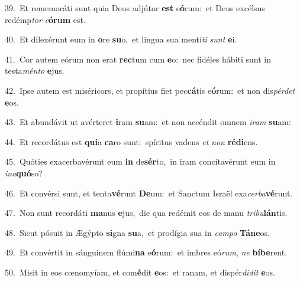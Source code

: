 {\numbfont\textcolor{\numbcolor}{39.}}~Et rememoráti sunt quia Deus adjútor \textbf{est} e\-\textbf{ó}\-rum:~\star et Deus excélsus redémp\textit{tor} \textit{e}\-\textbf{ó}\textbf{rum} est.\par
{\numbfont\textcolor{\numbcolor}{40.}}~Et dilexérunt eum in \textbf{o}\-re \textbf{su}\-o,~\star et lingua sua mentí\textit{ti} \textit{sunt} \textbf{e}\-i.\par
{\numbfont\textcolor{\numbcolor}{41.}}~Cor autem eórum non erat \textbf{rec}\-tum cum \textbf{e}\-o:~\star nec fidéles hábiti sunt in testa\-\textit{mén}\-\textit{to} \textbf{e}\-jus.\par
{\numbfont\textcolor{\numbcolor}{42.}}~Ipse autem est miséricors, et propítius fiet pec\-\textbf{cá}\-tis e\-\textbf{ó}\-rum:~\star et non dis\-\textit{pér}\-\textit{det} \textbf{e}\-os.\par
{\numbfont\textcolor{\numbcolor}{43.}}~Et abundávit ut avérteret \textbf{i}\-ram \textbf{su}\-am:~\star et non accéndit omnem \textit{i}\-\textit{ram} \textbf{su}\-am:\par
{\numbfont\textcolor{\numbcolor}{44.}}~Et recordátus est \textbf{qui}\-a \textbf{ca}\-ro sunt:~\star spíritus vadens \textit{et} \textit{non} \textbf{réd}\-\textbf{i}ens.\par
{\numbfont\textcolor{\numbcolor}{45.}}~Quóties exacerbavérunt eum \textbf{in} de\-\textbf{sér}\-to,~\star in iram concitavérunt eum in \textit{in}\-\textit{a}\textbf{quó}so?\par
{\numbfont\textcolor{\numbcolor}{46.}}~Et convérsi sunt, et tenta\-\textbf{vé}\-runt \textbf{De}\-um:~\star et Sanctum Israël exa\-\textit{cer}\-\textit{ba}\textbf{vé}runt.\par
{\numbfont\textcolor{\numbcolor}{47.}}~Non sunt recordáti \textbf{ma}\-nus \textbf{e}\-jus,~\star die qua redémit eos de manu \textit{tri}\-\textit{bu}\textbf{lán}tis.\par
{\numbfont\textcolor{\numbcolor}{48.}}~Sicut pósuit in Ægýpto \textbf{si}\-gna \textbf{su}\-a,~\star et prodígia sua in \textit{cam}\-\textit{po} \textbf{Tá}\-\textbf{ne}os.\par
{\numbfont\textcolor{\numbcolor}{49.}}~Et convértit in sánguinem flúmi\textbf{na} e\-\textbf{ó}\-rum:~\star et imbres eó\-\textit{rum}\-, \textit{ne} \textbf{bí}\-\textbf{be}rent.\par
{\numbfont\textcolor{\numbcolor}{50.}}~Misit in eos cœnomyíam, et com\-\textbf{é}\-dit \textbf{e}\-os:~\star et ranam, et dispér\-\textit{di}\-\textit{dit} \textbf{e}\-os.\par
